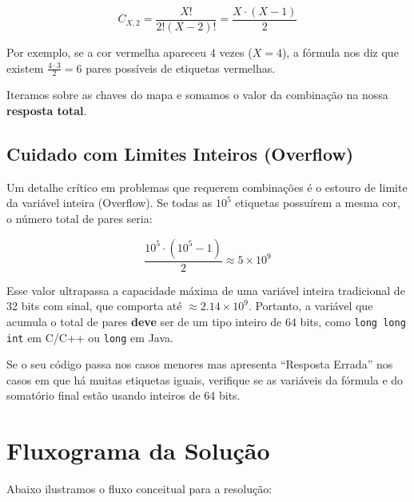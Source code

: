 \documentclass[11pt]{article}
\begin{document}
\[
C_{X, 2} = \frac{X!}{2!(X-2)!} = \frac{X \cdot (X-1)}{2}
\]

\begin{successbox}
Por exemplo, se a cor vermelha apareceu $4$ vezes ($X=4$), a fórmula nos diz que existem $\frac{4 \cdot 3}{2} = 6$ pares possíveis de etiquetas vermelhas.
\end{successbox}

Iteramos sobre as chaves do mapa e somamos o valor da combinação na nossa \textbf{resposta total}.

\subsection*{Cuidado com Limites Inteiros (Overflow)}

Um detalhe crítico em problemas que requerem combinações é o estouro de limite da variável inteira (Overflow). Se todas as $10^5$ etiquetas possuírem a mesma cor, o número total de pares seria:

\[
\frac{10^5 \cdot (10^5 - 1)}{2} \approx 5 \times 10^9
\]

Esse valor ultrapassa a capacidade máxima de uma variável inteira tradicional de 32 bits com sinal, que comporta até $\approx 2.14 \times 10^9$. Portanto, a variável que acumula o total de pares \textbf{deve} ser de um tipo inteiro de 64 bits, como \texttt{long long int} em C/C++ ou \texttt{long} em Java.

\begin{warnbox}
Se o seu código passa nos casos menores mas apresenta ``Resposta Errada'' nos casos em que há muitas etiquetas iguais, verifique se as variáveis da fórmula e do somatório final estão usando inteiros de 64 bits.
\end{warnbox}

\section*{Fluxograma da Solução}

Abaixo ilustramos o fluxo conceitual para a resolução:
\end{document}
